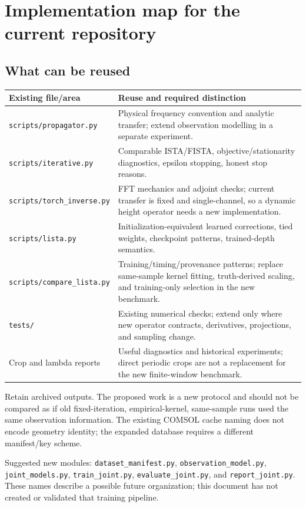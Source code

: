 \appendix
\section{Implementation map for the current repository}
\label{sec:implementation}
\subsection{What can be reused}
\begin{tabularx}{\linewidth}{P{51mm}Y}
\toprule Existing file/area & Reuse and required distinction\\\midrule
\texttt{scripts/propagator.py} & Physical frequency convention and analytic transfer; extend observation modelling in a separate experiment.\\
\texttt{scripts/iterative.py} & Comparable ISTA/FISTA, objective/stationarity diagnostics, epsilon stopping, honest stop reasons.\\
\texttt{scripts/torch\_inverse.py} & FFT mechanics and adjoint checks; current transfer is fixed and single-channel, so a dynamic height operator needs a new implementation.\\
\texttt{scripts/lista.py} & Initialization-equivalent learned corrections, tied weights, checkpoint patterns, trained-depth semantics.\\
\texttt{scripts/compare\_lista.py} & Training/timing/provenance patterns; replace same-sample kernel fitting, truth-derived scaling, and training-only selection in the new benchmark.\\
\texttt{tests/} & Existing numerical checks; extend only where new operator contracts, derivatives, projections, and sampling change.\\
Crop and lambda reports & Useful diagnostics and historical experiments; direct periodic crops are not a replacement for the new finite-window benchmark.\\\bottomrule
\end{tabularx}
Retain archived outputs. The proposed work is a new protocol and should not be compared as if old fixed-iteration, empirical-kernel, same-sample runs used the same observation information. The existing COMSOL cache naming does not encode geometry identity; the expanded database requires a different manifest/key scheme.

Suggested new modules: \texttt{dataset\_manifest.py}, \texttt{observation\_model.py}, \texttt{joint\_models.py}, \texttt{train\_joint.py}, \texttt{evaluate\_joint.py}, and \texttt{report\_joint.py}. These names describe a possible future organization; this document has not created or validated that training pipeline.

